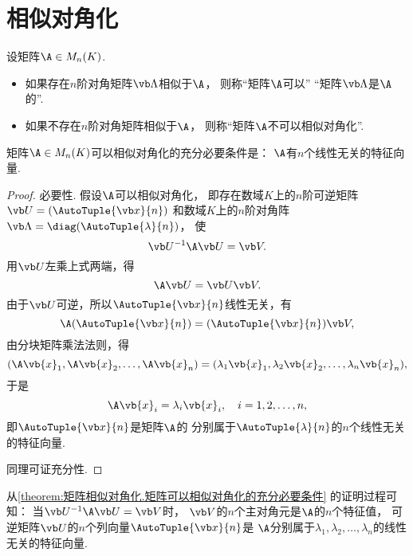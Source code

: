 \section{相似对角化}
\begin{definition}\label{definition:相似对角化.相似对角化}
设矩阵\(\A \in M_n(K)\).
\begin{itemize}
	\item 如果存在\(n\)阶对角矩阵\(\vb\Lambda\)相似于\(\A\)，
	则称“矩阵\(\A\)可以”
	“矩阵\(\vb\Lambda\)是\(\A\)的”.
	\item 如果不存在\(n\)阶对角矩阵相似于\(\A\)，
	则称“矩阵\(\A\)不可以{相似对角化}”.
\end{itemize}
\end{definition}

\begin{theorem}\label{theorem:矩阵相似对角化.矩阵可以相似对角化的充分必要条件}
矩阵\(\A \in M_n(K)\)可以相似对角化的充分必要条件是：
\(\A\)有\(n\)个线性无关的特征向量.
\begin{proof}
必要性.
假设\(\A\)可以相似对角化，
即存在数域\(K\)上的\(n\)阶可逆矩阵\(\P=(\AutoTuple{\x}{n})\)
和数域\(K\)上的\(n\)阶对角阵\(\vb\Lambda=\diag(\AutoTuple{\lambda}{n})\)，
使\[
	\P^{-1}\A\P=\V.
\]
用\(\P\)左乘上式两端，得\[
	\A\P=\P\V.
\]
由于\(\P\)可逆，所以\(\AutoTuple{\x}{n}\)线性无关，有\[
	\A(\AutoTuple{\x}{n})
	=(\AutoTuple{\x}{n})\V,
\]
由分块矩阵乘法法则，得\[
	(\A\vb{x}_1,\A\vb{x}_2,\dotsc,\A\vb{x}_n)
	=(\lambda_1\vb{x}_1,\lambda_2\vb{x}_2,\dotsc,\lambda_n\vb{x}_n),
\]
于是\[
	\A\vb{x}_i=\lambda_i\vb{x}_i,
	\quad i=1,2,\dotsc,n,
\]
即\(\AutoTuple{\x}{n}\)是矩阵\(\A\)的
分别属于\(\AutoTuple{\lambda}{n}\)的\(n\)个线性无关的特征向量.

同理可证充分性.
\end{proof}
\end{theorem}
\begin{remark}
从\cref{theorem:矩阵相似对角化.矩阵可以相似对角化的充分必要条件} 的证明过程可知：
{\color{red}当\(\P^{-1}\A\P=\V\)时，
\(\V\)的\(n\)个主对角元是\(\A\)的\(n\)个特征值，
可逆矩阵\(\P\)的\(n\)个列向量\(\AutoTuple{\x}{n}\)是
\(\A\)分别属于\(\lambda_1,\lambda_2,\dotsc,\lambda_n\)的线性无关的特征向量.}
\end{remark}

